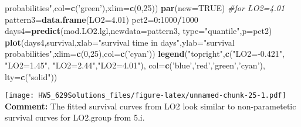 \documentclass[]{article}
\newenvironment{Shaded}{\begin{snugshade}}{\end{snugshade}}
\newcommand{\CommentTok}[1]{\textcolor[rgb]{0.56,0.35,0.01}{\textit{#1}}}
\newcommand{\DataTypeTok}[1]{\textcolor[rgb]{0.13,0.29,0.53}{#1}}
\newcommand{\DecValTok}[1]{\textcolor[rgb]{0.00,0.00,0.81}{#1}}
\newcommand{\FloatTok}[1]{\textcolor[rgb]{0.00,0.00,0.81}{#1}}
\newcommand{\KeywordTok}[1]{\textcolor[rgb]{0.13,0.29,0.53}{\textbf{#1}}}
\newcommand{\NormalTok}[1]{#1}
\newcommand{\OperatorTok}[1]{\textcolor[rgb]{0.81,0.36,0.00}{\textbf{#1}}}
\newcommand{\OtherTok}[1]{\textcolor[rgb]{0.56,0.35,0.01}{#1}}
\newcommand{\StringTok}[1]{\textcolor[rgb]{0.31,0.60,0.02}{#1}}
\begin{document}
\begin{Shaded}
\begin{Highlighting}[]
\StringTok{     probabilities"}\NormalTok{,}\DataTypeTok{col=}\KeywordTok{c}\NormalTok{(}\StringTok{'green'}\NormalTok{),}\DataTypeTok{xlim=}\KeywordTok{c}\NormalTok{(}\DecValTok{0}\NormalTok{,}\DecValTok{25}\NormalTok{))}
\KeywordTok{par}\NormalTok{(}\DataTypeTok{new=}\OtherTok{TRUE}\NormalTok{)}
\CommentTok{#for LO2=4.01}
\NormalTok{pattern3=}\KeywordTok{data.frame}\NormalTok{(}\DataTypeTok{LO2=}\FloatTok{4.01}\NormalTok{)}
\NormalTok{pct2=}\DecValTok{0}\OperatorTok{:}\DecValTok{1000}\OperatorTok{/}\DecValTok{1000}
\NormalTok{days4=}\KeywordTok{predict}\NormalTok{(mod.LO2.lgl,}\DataTypeTok{newdata=}\NormalTok{pattern3,}
              \DataTypeTok{type=}\StringTok{"quantile"}\NormalTok{,}\DataTypeTok{p=}\NormalTok{pct2)}
\KeywordTok{plot}\NormalTok{(days4,survival,}\DataTypeTok{xlab=}\StringTok{"survival time in days"}\NormalTok{,}\DataTypeTok{ylab=}\StringTok{"survival}
\StringTok{     probabilities"}\NormalTok{,}\DataTypeTok{xlim=}\KeywordTok{c}\NormalTok{(}\DecValTok{0}\NormalTok{,}\DecValTok{25}\NormalTok{),}\DataTypeTok{col=}\KeywordTok{c}\NormalTok{(}\StringTok{'cyan'}\NormalTok{))}
\KeywordTok{legend}\NormalTok{(}\StringTok{"topright"}\NormalTok{,}\KeywordTok{c}\NormalTok{(}\StringTok{"LO2=-0.421"}\NormalTok{, }\StringTok{"LO2=1.45"}\NormalTok{, }\StringTok{"LO2=2.44"}\NormalTok{,}\StringTok{"LO2=4.01"}\NormalTok{), }
\DataTypeTok{col=}\KeywordTok{c}\NormalTok{(}\StringTok{'blue'}\NormalTok{,}\StringTok{'red'}\NormalTok{,}\StringTok{'green'}\NormalTok{,}\StringTok{'cyan'}\NormalTok{), }\DataTypeTok{lty=}\KeywordTok{c}\NormalTok{(}\StringTok{"solid"}\NormalTok{))}
\end{Highlighting}
\end{Shaded}

\texttt{[image: HW5\_629Solutions\_files/figure-latex/unnamed-chunk-25-1.pdf]}
\textbf{Comment:} The fitted survival curves from LO2 look similar to
non-parametetic survival curves for LO2.group from 5.i.
\end{document}
